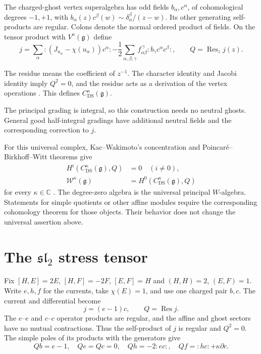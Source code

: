 The charged-ghost vertex superalgebra has odd fields
$b_\alpha,c^\alpha$, of cohomological degrees $-1,+1$, with
$b_\alpha(z)c^\beta(w)\sim\delta_\alpha^\beta/(z-w)$.
Its other generating self-products are regular.
Colons denote the normal ordered product of fields.
On the tensor product with $V^\kappa(\mathfrak g)$ define
\[
 j=\sum_\alpha :(J_{u_\alpha}-\chi(u_\alpha))c^\alpha:
 -\frac12\sum_{\alpha,\beta,\gamma}
 f_{\alpha\beta}^{\ \gamma}:b_\gamma c^\alpha c^\beta:,
 \qquad Q=\operatorname{Res}_z j(z).
\]

The residue means the coefficient of $z^{-1}$.
The character identity and Jacobi identity imply $Q^2=0$,
and the residue acts as a derivation of the vertex operations
\cite[Section 2]{KacRoanWakimoto2003}.
This defines $C_{\mathrm{DS}}^\kappa(\mathfrak g)$.

The principal grading is integral, so this construction needs
no neutral ghosts.  General good half-integral gradings have
additional neutral fields and the corresponding correction to $j$.

For this universal complex, Kac--Wakimoto's concentration and
Poincar\'e--Birkhoff--Witt theorems give
\begin{align*}
 H^i(C_{\mathrm{DS}}^\kappa(\mathfrak g),Q)&=0\quad(i\ne0),\\
 \mathcal W^\kappa(\mathfrak g)&=H^0(C_{\mathrm{DS}}^\kappa(\mathfrak g),Q)
\end{align*}
for every $\kappa\in\mathbb C$
\cite[Theorem 4.1]{KacWakimoto2004}.
The degree-zero algebra is the universal principal $W$-algebra.
Statements for simple quotients or other affine modules require
the corresponding cohomology theorem for those objects.
Their behavior does not change the universal assertion above.

\section{The \(\mathfrak{sl}_2\) stress tensor}
Fix $[H,E]=2E$, $[H,F]=-2F$, $[E,F]=H$ and
$(H,H)=2$, $(E,F)=1$.
Write $e,h,f$ for the currents, take $\chi(E)=1$, and use one
charged pair $b,c$.
The current and differential become
\[
 j=(e-1)c,\qquad Q=\operatorname{Res}j.
\]
The $e$--$e$ and $c$--$c$ operator products are regular, and
the affine and ghost sectors have no mutual contractions.
Thus the self-product of $j$ is regular and $Q^2=0$.
The simple poles of its products with the generators give
\[
 Qb=e-1,\quad Qe=Qc=0,\quad
 Qh=-2:ec:,\quad Qf=:hc:+\kappa\partial c.
\]

